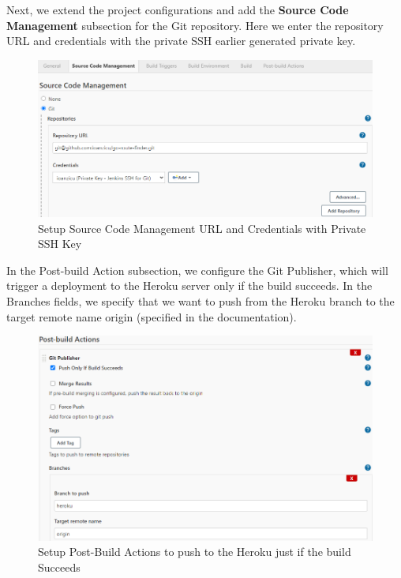 \documentclass[12pt,a4paper,twoside]{article}
\begin{document}
Next, we extend the project configurations and add the \textbf{Source Code Management} subsection for the Git repository. Here we enter the repository URL and credentials with the private SSH earlier generated private key.


\begin{figure}[H]
    \centering
        \includegraphics[width=15cm]{images-git-heroku/add-private-key-jenkins.png}
        \caption{Setup Source Code Management URL and Credentials with Private SSH Key}
\end{figure}


In the Post-build Action subsection, we configure the Git Publisher, which will trigger a deployment to the Heroku server only if the build succeeds. In the Branches fields, we specify that we want to push from the Heroku branch to the target remote name origin (specified in the documentation).


\begin{figure}[H]
    \centering
        \includegraphics[width=15cm]{images-git-heroku/add-post-build-action-deployment.png}
        \caption{Setup Post-Build Actions to push to the Heroku just if the build Succeeds}
\end{figure}
\end{document}
